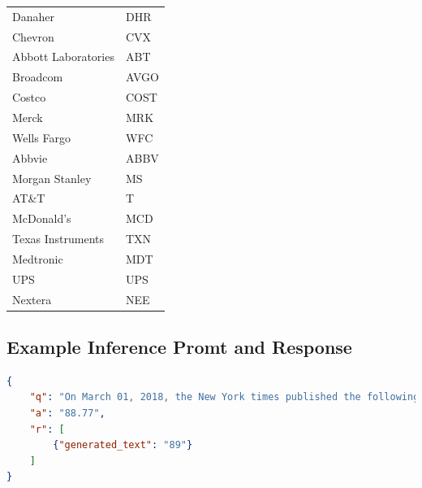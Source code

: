 \documentclass[conference]{IEEEtran}
\begin{document}
\begin{singlespace}
\begin{table}[H]
\begin{tabular}{|l|l|}
    Danaher & DHR \\
    Chevron & CVX \\
    Abbott Laboratories & ABT \\
    Broadcom & AVGO \\
    Costco & COST \\
    Merck & MRK \\
    Wells Fargo & WFC \\
    Abbvie & ABBV \\
    Morgan Stanley & MS \\
    AT\&T & T \\
    McDonald's & MCD \\
    Texas Instruments & TXN \\
    Medtronic & MDT \\
    UPS & UPS \\
    Nextera & NEE \\
    \hline
\end{tabular}
\label{table:stockSources}
\end{table}

\onecolumn
\subsection{Example Inference Promt and Response}
\label{Examples}
\begin{lstlisting}[language=json,firstnumber=1]
{
	"q": "On March 01, 2018, the New York times published the following article regarding Walmart(Ticker: WMT) from their Business news desk. Headline: Walmart to Raise Age to Buy Guns and Ammunition to 21. Lead paragraph: Walmart, the largest retailer in the United States, said Wednesday evening that it would stop selling guns and ammunition to anyone under 21 years of age and remove from its stores all toys and airsoft rifles that resemble assault-style weapons. When the news of this was released, past stock prices were: $92.77, $92.89, $93.12, $91.52, $90.01, $89.08. After this news was announced, the following day's price was: $",
	"a": "88.77",
	"r": [
		{"generated_text": "89"}
	]
}
\end{lstlisting}

\end{singlespace}
\end{document}
